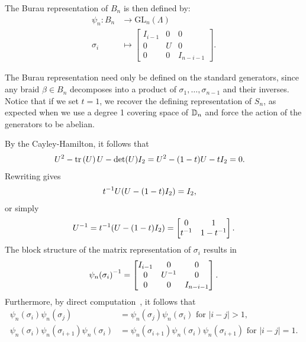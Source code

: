 The Burau representation of $B_n$ is then defined by:
\begin{align}
    \psi_n:B_n&\to\textrm{GL}_n(\Lambda) \\
    \sigma_i &\mapsto \begin{bmatrix}
        I_{i-1} & 0 & 0 \\
        0 & U & 0 \\
        0 & 0 & I_{n-i-1}
    \end{bmatrix}.
\end{align}

The Burau representation need only be defined on the standard generators, since any braid $\beta\in B_n$ decomposes into a product of $\sigma_1,\dots,\sigma_{n-1}$ and their inverses. Notice that if we set $t = 1$, we recover the defining representation of $S_n$, as expected when we use a degree 1 covering space of $\mathbb{D}_n$ and force the action of the generators to be abelian.

By the Cayley-Hamilton, it follows that~\cite{Kassel2008}
\begin{align}
    U^2 - \textrm{tr}\left(U\right)U - \det(U)I_2 &= U^2 - (1-t)U - tI_2 = 0.
\end{align}
Rewriting gives
\begin{align}
    { t }^{-1}U(U - (1-t)I_2) &= I_2,
\end{align}
or simply
\begin{equation}
    { U }^{-1} = { t }^{-1}(U - (1-t)I_2) = \begin{bmatrix}
        0 & 1 \\ { t }^{-1} & 1-{ t }^{-1}
    \end{bmatrix}.
\end{equation}
The block structure of the matrix representation of $\sigma_i$ results in
\begin{align*}
    { \psi_n(\sigma_i) }^{-1} = \begin{bmatrix}
        I_{i-1} & 0 & 0 \\
        0 & { U }^{-1} & 0 \\
        0 & 0 & I_{n-i-1}
    \end{bmatrix}.
\end{align*}
Furthermore, by direct computation~\cite{Kassel2008}, it follows that
\begin{align}
    \psi_n(\sigma_i)\psi_n(\sigma_j) &= \psi_n(\sigma_j)\psi_n(\sigma_i) \textrm{ for } |i-j|>1, \\
    \psi_n(\sigma_i)\psi_n(\sigma_{i+1})\psi_n(\sigma_i) &= \psi_n(\sigma_{i+1})\psi_n(\sigma_i)\psi_n(\sigma_{i+1}) \textrm{ for } |i-j|=1.
\end{align}

